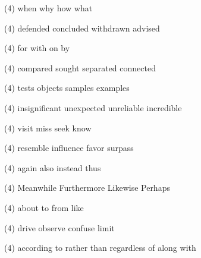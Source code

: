\item
\begin{tasks}(4)
	\task when
	\task why
	\task how
	\task what
\end{tasks}
\item
\begin{tasks}(4)
	\task defended
	\task concluded
	\task withdrawn
	\task advised
\end{tasks}
\item
\begin{tasks}(4)
	\task for
	\task with
	\task on
	\task by
\end{tasks}
\item
\begin{tasks}(4)
	\task compared
	\task sought
	\task separated
	\task connected
\end{tasks}
\item
\begin{tasks}(4)
	\task tests
	\task objects
	\task samples
	\task examples
\end{tasks}
\item
\begin{tasks}(4)
	\task insignificant
	\task unexpected
	\task unreliable
	\task incredible
\end{tasks}
\item
\begin{tasks}(4)
	\task visit
	\task miss
	\task seek
	\task know
\end{tasks}
\item
\begin{tasks}(4)
	\task resemble
	\task influence
	\task favor
	\task surpass
\end{tasks}
\item
\begin{tasks}(4)
	\task again
	\task also
	\task instead
	\task thus
\end{tasks}
\item
\begin{tasks}(4)
	\task Meanwhile
	\task Furthermore
	\task Likewise
	\task Perhaps
\end{tasks}
\item
\begin{tasks}(4)
	\task about
	\task to
	\task from
	\task like
\end{tasks}
\item
\begin{tasks}(4)
	\task drive
	\task observe
	\task confuse
	\task limit
\end{tasks}
\item
\begin{tasks}(4)
	\task according to
	\task rather than
	\task regardless of
	\task along with
\end{tasks}
